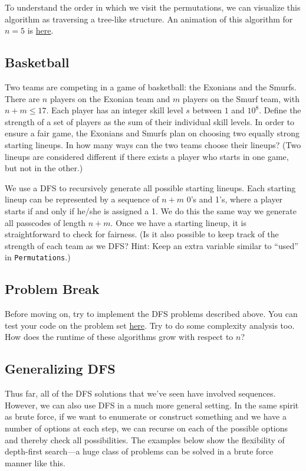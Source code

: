 To understand the order in which we visit the permutations, we can visualize this algorithm as traversing a tree-like structure. An animation of this algorithm for $n = 5$ is \href{http://dabbler0.github.io/ecc-animations/dfs.html}{here}.

\subsection{Basketball}

\begin{typewriter}
Two teams are competing in a game of basketball: the Exonians and the Smurfs. There are $n$ players on the Exonian team and $m$ players on the Smurf team, with $n + m \le 17$. Each player has an integer skill level $s$ between $1$ and $10^8$. Define the strength of a set of players as the sum of their individual skill levels. In order to ensure a fair game, the Exonians and Smurfs plan on choosing two equally strong starting lineups. In how many ways can the two teams choose their lineups? (Two lineups are considered different if there exists a player who starts in one game, but not in the other.)
\end{typewriter}

We use a DFS to recursively generate all possible starting lineups. Each starting lineup can be represented by a sequence of $n + m$ 0's and 1's, where a player starts if and only if he/she is assigned a 1. We do this the same way we generate all passcodes of length $n + m$. Once we have a starting lineup, it is straightforward to check for fairness. (Is it also possible to keep track of the strength of each team as we DFS? Hint: Keep an extra variable similar to ``used'' in \texttt{Permutations}.)

\subsection{Problem Break}

Before moving on, try to implement the DFS problems described above. You can test your code on the problem set \href{http://codeforces.com/group/5tN48zOVvQ/contest/205012}{here}. Try to do some complexity analysis too. How does the runtime of these algorithms grow with respect to $n$?

\subsection{Generalizing DFS}

Thus far, all of the DFS solutions that we've seen have involved sequences. However, we can also use DFS in a much more general setting. In the same spirit as brute force, if we want to enumerate or construct something and we have a number of options at each step, we can recurse on each of the possible options and thereby check all possibilities. The examples below show the flexibility of depth-first search---a huge class of problems can be solved in a brute force manner like this.

